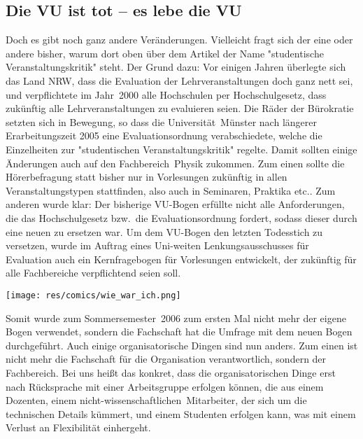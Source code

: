 \begin{multicols}{2}
\subsection*{Die VU ist tot -- es lebe die VU}
\vspace{-1em}
Doch es gibt noch ganz andere Veränderungen. Vielleicht fragt sich der eine oder andere bisher, warum dort oben über dem Artikel der Name "studentische Veranstaltungskritik" steht. Der Grund dazu: Vor einigen Jahren überlegte sich das Land NRW, dass die Evaluation der Lehrveranstaltungen doch ganz nett sei, und verpflichtete im Jahr~2000 alle Hochschulen per Hochschulgesetz, dass zukünftig alle Lehrveranstaltungen zu evaluieren seien. Die Räder der Bürokratie setzten sich in Bewegung, so dass die Universität~Münster nach längerer Erarbeitungszeit 2005 eine Evaluationsordnung verabschiedete, welche die Einzelheiten zur "studentischen Veranstaltungskritik" regelte. Damit sollten einige Änderungen auch auf den Fachbereich~Physik zukommen. Zum einen sollte die Hörerbefragung statt bisher nur in Vorlesungen zukünftig in allen Veranstaltungstypen stattfinden, also auch in Seminaren, Praktika etc.. Zum anderen wurde klar: Der bisherige VU-Bogen erfüllte nicht alle Anforderungen, die das Hochschulgesetz bzw.\ die Evaluationsordnung fordert, sodass dieser durch eine neuen zu ersetzen war. Um dem VU-Bogen den letzten Todesstich zu versetzen, wurde im Auftrag eines Uni-weiten Lenkungsausschusses für Evaluation auch ein Kernfragebogen für Vorlesungen entwickelt, der zukünftig für alle Fachbereiche verpflichtend seien soll.

\vspace{-2.8ex}
\begin{center}
	\texttt{[image: res/comics/wie\_war\_ich.png]}
\end{center}
\vspace{-3ex}

Somit wurde zum Sommersemester~2006 zum ersten Mal nicht mehr der eigene Bogen verwendet, sondern die Fachschaft hat die Umfrage mit dem neuen Bogen durchgeführt. Auch einige organisatorische Dingen sind nun anders. Zum einen ist nicht mehr die Fachschaft für die Organisation verantwortlich, sondern der Fachbereich. Bei uns heißt das konkret, dass die organisatorischen Dinge erst nach Rücksprache mit einer Arbeitsgruppe erfolgen können, die aus einem Dozenten, einem nicht-wissenschaftlichen~Mitarbeiter, der sich um die technischen Details kümmert, und einem Studenten erfolgen kann, was mit einem Verlust an Flexibilität einhergeht.


\end{multicols}
